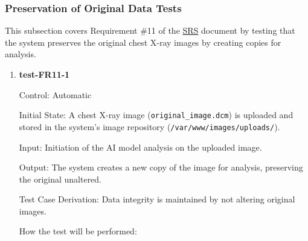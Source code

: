 \documentclass[12pt, titlepage]{article}
\begin{document}
\subsubsection{Preservation of Original Data Tests}

This subsection covers Requirement \#11 of the \href{https://github.com/RezaJodeiri/CXR-Capstone/blob/main/docs/SRS/SRS.pdf}{SRS} \citep{SRS}
document by testing that the system preserves the original chest X-ray images by creating copies for analysis.

\begin{enumerate}

\item \textbf{test-FR11-1} \label{test-FR11-1}

Control: Automatic

Initial State: A chest X-ray image (\texttt{original\_image.dcm}) is uploaded and stored in the system's image repository (\texttt{/var/www/images/uploads/}).

Input: Initiation of the AI model analysis on the uploaded image.

Output: The system creates a new copy of the image for analysis, preserving the original unaltered.

Test Case Derivation: Data integrity is maintained by not altering original images.

How the test will be performed:


\end{enumerate}
\end{document}
